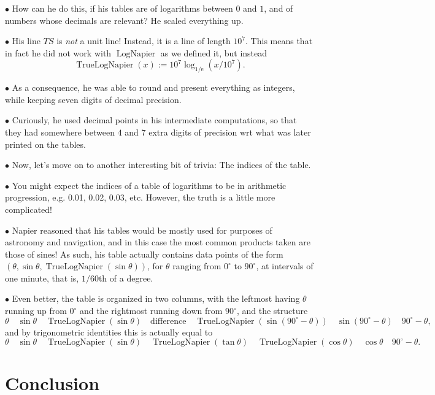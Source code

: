 \documentclass{article}
\newcommand{\e}{\mathrm{e}}
\newcommand\point[1]{\noindent \hspace{\labelsep} $\bullet$ #1 \smallskip}
\DeclareMathOperator{\lognap}{LogNapier}
\DeclareMathOperator{\truelognap}{TrueLogNapier}
\begin{document}
\point{How can he do this, if his tables are of logarithms between $0$ and $1$, and of numbers whose decimals are relevant? He scaled everything up.}

\point{His line $TS$ is \emph{not} a unit line! Instead, it is a line of length $10^7$. This means that in fact he did not work with $\lognap$ as we defined it, but instead
\begin{equation}
\truelognap(x) := 10^7 \log_{1/\e}(x/10^7).
\end{equation}}

\point{As a consequence, he was able to round and present everything as integers, while keeping seven digits of decimal precision.}

\point{Curiously, he used decimal points in his intermediate computations, so that they had somewhere between $4$ and $7$ extra digits of precision wrt what was later printed on the tables.}

\point{Now, let's move on to another interesting bit of trivia: The indices of the table.}

\point{You might expect the indices of a table of logarithms to be in arithmetic progression, e.g. 0.01, 0.02, 0.03, etc. However, the truth is a little more complicated!}

\point{Napier reasoned that his tables would be mostly used for purposes of astronomy and navigation, and in this case the most common products taken are those of sines! As such, his table actually contains data points of the form $(\theta, \sin\theta, \truelognap(\sin\theta))$, for $\theta$ ranging from $0^\circ$ to $90^\circ$, at intervals of one minute, that is, $1/60$th of a degree.}

\point{Even better, the table is organized in two columns, with the leftmost having $\theta$ running up from $0^\circ$ and the rightmost running down from $90^\circ$, and the structure
\begin{equation}
\theta \quad \sin\theta \quad \truelognap(\sin\theta) \quad \text{difference} \quad \truelognap(\sin(90^\circ-\theta)) \quad \sin(90^\circ-\theta) \quad 90^\circ - \theta,
\end{equation}
and by trigonometric identities this is actually equal to
\begin{equation}
\theta \quad \sin\theta \quad \truelognap(\sin\theta) \quad \truelognap(\tan\theta) \quad \truelognap(\cos\theta) \quad \cos\theta \quad 90^\circ - \theta.
\end{equation}}

\section{Conclusion}
\end{document}
